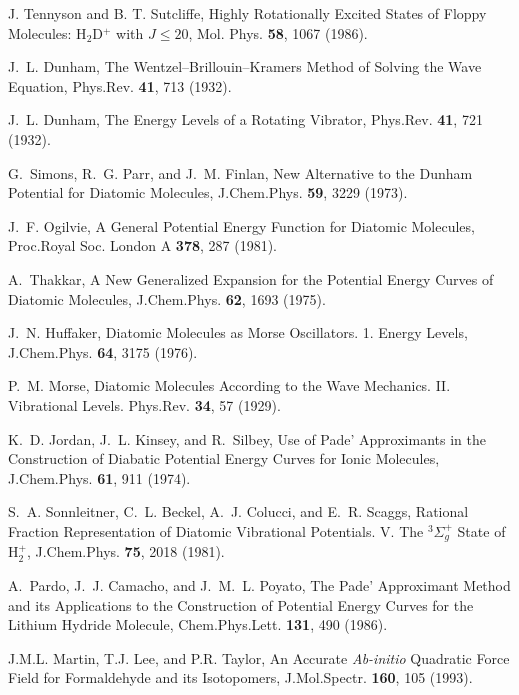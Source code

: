 \begin{thebibliography}{999}
J. Tennyson and B. T. Sutcliffe, 
Highly Rotationally Excited
States of Floppy Molecules: H$_2$D$^+$ with $J \leq 20$,
Mol. Phys. {\bf 58}, 1067 (1986).


J.~L. Dunham,
The Wentzel--Brillouin--Kramers Method of Solving
the Wave Equation,
\newblock Phys.Rev. {\bf 41}, 713 (1932).

J.~L. Dunham,
The Energy Levels of a Rotating Vibrator,
\newblock Phys.Rev. {\bf 41}, 721 (1932).

G.~Simons, R.~G. Parr, and J.~M. Finlan,
New Alternative to the Dunham Potential for Diatomic Molecules,
\newblock J.Chem.Phys. {\bf 59}, 3229 (1973).

J.~F. Ogilvie,
A General Potential Energy Function for Diatomic Molecules,
\newblock Proc.Royal Soc. London A {\bf 378}, 287 (1981).

A.~Thakkar,
A New Generalized Expansion for the Potential Energy 
Curves of Diatomic Molecules,
\newblock J.Chem.Phys. {\bf 62}, 1693 (1975).

J.~N. Huffaker,
Diatomic Molecules as Morse Oscillators. 1. Energy Levels,
\newblock J.Chem.Phys. {\bf 64}, 3175 (1976).

P.~M. Morse,
Diatomic Molecules According to the Wave Mechanics. II. 
Vibrational Levels.
\newblock Phys.Rev. {\bf 34}, 57 (1929).

K.~D. Jordan, J.~L. Kinsey, and R.~Silbey,
Use of Pade' Approximants in the Construction of 
Diabatic Potential Energy Curves for Ionic Molecules,
\newblock J.Chem.Phys. {\bf 61}, 911 (1974).


S.~A. Sonnleitner, C.~L. Beckel, A.~J. Colucci, and E.~R. Scaggs,
Rational Fraction Representation of Diatomic 
Vibrational Potentials. V. The $^{3} \Sigma_g^+ $ State of H$_2^+$,
\newblock J.Chem.Phys. {\bf 75}, 2018 (1981).

A.~Pardo, J.~J. Camacho, and J.~M.~L. Poyato,
The Pade' Approximant Method and its Applications to the Construction of
Potential Energy Curves for the Lithium Hydride Molecule,
\newblock Chem.Phys.Lett. {\bf 131}, 490 (1986).


J.M.L. Martin, T.J. Lee, and P.R. Taylor,
An Accurate {\it Ab-initio} Quadratic Force Field for
Formaldehyde and its Isotopomers,
J.Mol.Spectr. {\bf 160}, 105 (1993).


\end{thebibliography}
